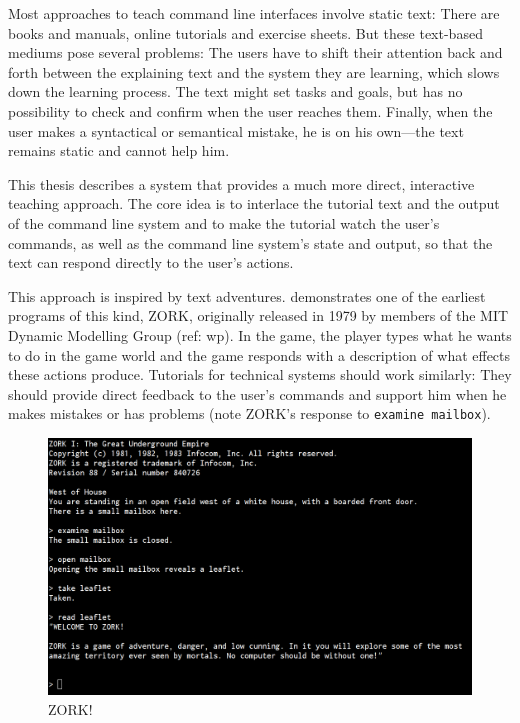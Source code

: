 \documentclass[paper=a4,twoside,abstract=on,cleardoublepage=empty,numbers=noenddot,toc=bib,11pt,appendixprefix=true]{scrreprt}
\begin{document}
Most approaches to teach command line interfaces involve static text: There are books and manuals, online tutorials and exercise sheets. But these text-based mediums pose several problems: The users have to shift their attention back and forth between the explaining text and the system they are learning, which slows down the learning process. The text might set tasks and goals, but has no possibility to check and confirm when the user reaches them. Finally, when the user makes a syntactical or semantical mistake, he is on his own---the text remains static and cannot help him.

This thesis describes a system that provides a much more direct, interactive teaching approach. The core idea is to interlace the tutorial text and the output of the command line system and to make the tutorial watch the user's commands, as well as the command line system's state and output, so that the text can respond directly to the user's actions.

This approach is inspired by text adventures.  demonstrates one of the earliest programs of this kind, \textsc{ZORK}, originally released in 1979 by members of the MIT Dynamic Modelling Group (ref: wp). In the game, the player types what he wants to do in the game world and the game responds with a description of what effects these actions produce. Tutorials for technical systems should work similarly: They should provide direct feedback to the user's commands and support him when he makes mistakes or has problems (note ZORK's response to \texttt{examine mailbox}).

\begin{figure}[tb]
    \includegraphics[width=\textwidth]{zork1.png}
    \centering
    \caption{ZORK!}
    \label{fig:zork}
\end{figure}
\end{document}
